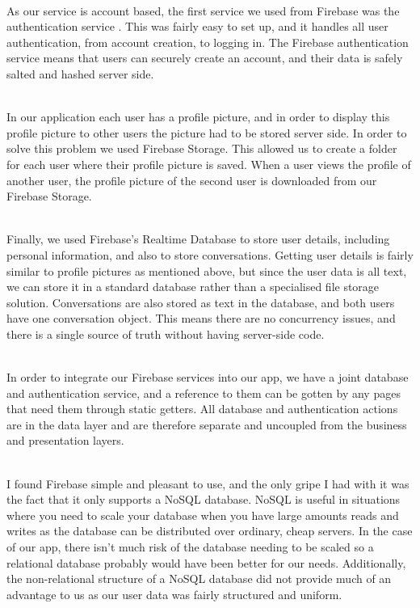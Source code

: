\documentclass[a4paper, 11pt]{article}
\begin{document}
~\\
As our service is account based, the first service we used from Firebase was the authentication service \cite{FirebaseAuth}. This was fairly easy to set up, and it handles all user authentication, from account creation, to logging in. The Firebase authentication service means that users can securely create an account, and their data is safely salted and hashed server side.

~\\
In our application each user has a profile picture, and in order to display this profile picture to other users the picture had to be stored server side. In order to solve this problem we used Firebase Storage. This allowed us to create a folder for each user where their profile picture is saved. When a user views the profile of another user, the profile picture of the second user is downloaded from our Firebase Storage.

~\\
Finally, we used Firebase's Realtime Database \cite{firebaseDB} to store user details, including personal information, and also to store conversations. Getting user details is fairly similar to profile pictures as mentioned above, but since the user data is all text, we can store it in a standard database rather than a specialised file storage solution. Conversations are also stored as text in the database, and both users have one conversation object. This means there are no concurrency issues, and there is a single source of truth without having server-side code.

~\\
In order to integrate our Firebase services into our app, we have a joint database and authentication service, and a reference to them can be gotten by any pages that need them through static getters. All database and authentication actions are in the data layer and are therefore separate and uncoupled from the business and presentation layers.

~\\
I found Firebase simple and pleasant to use, and the only gripe I had with it was the fact that it only supports a NoSQL database. NoSQL is useful in situations where you need to scale your database when you have large amounts reads and writes as the database can be distributed over ordinary, cheap servers. In the case of our app, there isn’t much risk of the database needing to be scaled so a relational database probably would have been better for our needs. Additionally, the non-relational structure of a NoSQL database did not provide much of an advantage to us as our user data was fairly structured and uniform.
\end{document}
